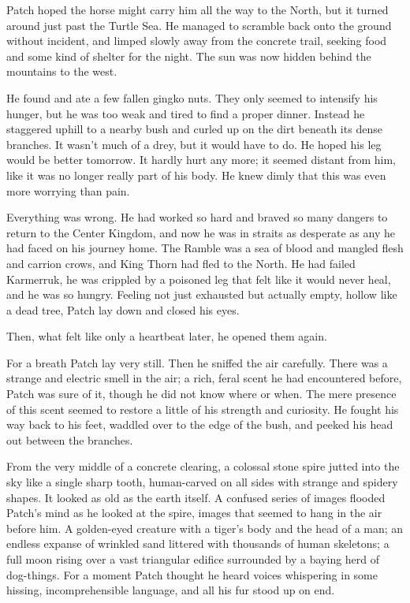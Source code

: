 \documentclass[12pt]{book}
\begin{document}
 Patch hoped the horse might carry him all the way to the North, but it turned around just past the Turtle Sea. He managed to scramble back onto the ground without incident, and limped slowly away from the concrete trail, seeking food and some kind of shelter for the night. The sun was now hidden behind the mountains to the west.\par
 He found and ate a few fallen gingko nuts. They only seemed to intensify his hunger, but he was too weak and tired to find a proper dinner. Instead he staggered uphill to a nearby bush and curled up on the dirt beneath its dense branches. It wasn't much of a drey, but it would have to do. He hoped his leg would be better tomorrow. It hardly hurt any more; it seemed distant from him, like it was no longer really part of his body. He knew dimly that this was even more worrying than pain.\par
 Everything was wrong. He had worked so hard and braved so many dangers to return to the Center Kingdom, and now he was in straits as desperate as any he had faced on his journey home. The Ramble was a sea of blood and mangled flesh and carrion crows, and King Thorn had fled to the North. He had failed Karmerruk, he was crippled by a poisoned leg that felt like it would never heal, and he was so hungry. Feeling not just exhausted but actually empty, hollow like a dead tree, Patch lay down and closed his eyes.\par
 Then, what felt like only a heartbeat later, he opened them again.\par
 For a breath Patch lay very still. Then he sniffed the air carefully. There was a strange and electric smell in the air; a rich, feral scent he had encountered before, Patch was sure of it, though he did not know where or when. The mere presence of this scent seemed to restore a little of his strength and curiosity. He fought his way back to his feet, waddled over to the edge of the bush, and peeked his head out between the branches.\par
 From the very middle of a concrete clearing, a colossal stone spire jutted into the sky like a single sharp tooth, human-carved on all sides with strange and spidery shapes. It looked as old as the earth itself. A confused series of images flooded Patch's mind as he looked at the spire, images that seemed to hang in the air before him. A golden-eyed creature with a tiger's body and the head of a man; an endless expanse of wrinkled sand littered with thousands of human skeletons; a full moon rising over a vast triangular edifice surrounded by a baying herd of dog-things. For a moment Patch thought he heard voices whispering in some hissing, incomprehensible language, and all his fur stood up on end.\par
\end{document}
